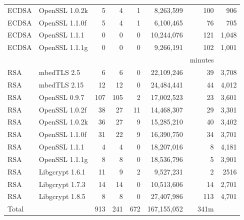 \begin{table}
\begin{tabular}{llrrrrrr}
    ECDSA              & OpenSSL 1.0.2k           & 5                 & 4                 & 1              & 8,263,599   & 100     & 906   \\
    ECDSA              & OpenSSL 1.1.0f           & 5                 & 4                 & 1              & 6,100,465   & 76      & 705   \\
    ECDSA              & OpenSSL 1.1.1            & 0                 & 0                 & 0              & 10,244,076  & 121     & 1,048 \\
    ECDSA              & OpenSSL 1.1.1g           & 0                 & 0                 & 0              & 9,266,191   & 102     & 1,001 \\

                       &                          &                   &                   &                &             & minutes         \\\cline{7-7}
    RSA                & mbedTLS 2.5              & 6                 & 6                 & 0              & 22,109,246  & 39      & 3,708 \\
    RSA                & mbedTLS 2.15             & 12                & 12                & 0              & 24,484,441  & 44      & 4,012 \\
    RSA                & OpenSSL 0.9.7            & 107               & 105               & 2              & 17,002,523  & 23      & 3,601 \\
    RSA                & OpenSSL 1.0.2f           & 38                & 27                & 11             & 14,468,307  & 29      & 3,301 \\
    RSA                & OpenSSL 1.0.2k           & 36                & 27                & 9              & 15,285,210  & 40      & 3,402 \\
    RSA                & OpenSSL 1.1.0f           & 31                & 22                & 9              & 16,390,750  & 34      & 3,701 \\
    RSA                & OpenSSL 1.1.1            & 4                 & 4                 & 0              & 18,207,016  & 8       & 4,181 \\
    RSA                & OpenSSL 1.1.1g           & 8                 & 8                 & 0              & 18,536,796  & 5       & 3,901 \\
    RSA                & Libgcrypt 1.6.1          & 11                & 9                 & 2              & 9,527,231   & 2       & 2516  \\
    RSA                & Libgcrypt 1.7.3          & 14                & 14                & 0              & 10,513,606  & 14      & 2,701 \\
    RSA                & Libgcrypt 1.8.5          & 8                 & 8                 & 0              & 27,407,986  & 113     & 4,701 \\

    Total              &                          & 913               & 241               & 672            & 167,155,052 & 341m            \\\hline
  \end{tabular}
\end{table}
